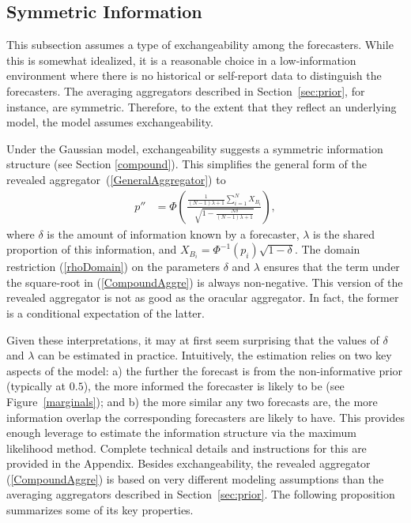 \documentclass[11pt]{article}
\theoremstyle{definition}
\theoremstyle{definition}
\begin{document}
\subsection{Symmetric Information}
\label{compound2}
This subsection assumes a type of exchangeability among the forecasters.
While this is somewhat idealized, it is a reasonable choice in a
low-information environment where there is no historical or
self-report data to distinguish the forecasters.  The averaging
aggregators described in Section~\ref{sec:prior}, for instance, are
symmetric. Therefore, to the extent that they reflect an underlying
model, the model assumes exchangeability. 

Under the Gaussian model, exchangeability suggests a
symmetric information structure (see Section \ref{compound}). This simplifies the
general form of the revealed aggregator~(\ref{GeneralAggregator})  to
\begin{align}
p''
  &=\Phi\left(\frac{\frac{1}{(N-1)\lambda +1} 
  \sum_{i=1}^N X_{B_i} }{\sqrt{1- \frac{N\delta}{(N-1)\lambda +1} }}  
  \right), \label{CompoundAggre}
\end{align}
where $\delta$ is the amount of information known by a forecaster, 
$\lambda$ is the shared proportion of this information, and $X_{B_i} =
\Phi^{-1}(p_i)\sqrt{1-\delta}$. 
The domain restriction (\ref{rhoDomain}) on the parameters $\delta$ and $\lambda$ ensures that the term under
the square-root in (\ref{CompoundAggre}) is always non-negative. This version of the revealed aggregator is not as good as the oracular
aggregator. In fact, the former is a conditional expectation of the latter.

Given these interpretations, it may at first seem surprising that the
values of $\delta$ and $\lambda$ can be estimated in practice.
Intuitively, the estimation relies on two key aspects of the model: a)
the further the forecast is from the non-informative prior (typically
at $0.5$), the more informed the forecaster is likely to be (see
Figure~\ref{marginals}); and b) the more similar any two forecasts
are, the more information overlap the corresponding forecasters are
likely to have. This provides enough leverage to estimate the
information structure via the maximum likelihood method.  Complete
technical details and instructions for this are provided in the
Appendix.  Besides exchangeability, the revealed aggregator
(\ref{CompoundAggre}) is based on very different modeling assumptions
than the averaging aggregators described in
Section~\ref{sec:prior}. The following proposition summarizes some of
its key properties.
\end{document}
